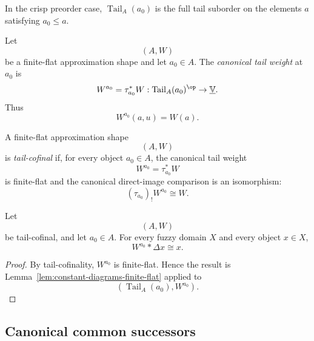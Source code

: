 In the crisp preorder case, \(\operatorname{Tail}_A(a_0)\) is the full tail
suborder on the elements \(a\) satisfying \(a_0\leq a\).

\begin{definition}
\label{def:canonical-tail-weight}
Let
\[
    (A,W)
\]
be a finite-flat approximation shape and let \(a_0\in A\).  The
\emph{canonical tail weight} at \(a_0\) is
\[
    W^{a_0}
    =
    \tau_{a_0}^{*}W
    :
    \operatorname{Tail}_A(a_0)^{\op}
    \to
    \underline{\mathbb V}.
\]
Thus
\[
    W^{a_0}(a,u)=W(a).
\]
\end{definition}

\begin{definition}
\label{def:tail-cofinal-approximation-shape}
A finite-flat approximation shape
\[
    (A,W)
\]
is \emph{tail-cofinal} if, for every object \(a_0\in A\), the canonical tail
weight
\[
    W^{a_0}=\tau_{a_0}^{*}W
\]
is finite-flat and the canonical direct-image comparison is an isomorphism:
\[
    (\tau_{a_0})_!W^{a_0}\cong W.
\]
\end{definition}

\begin{lemma}
\label{lem:constant-diagrams-canonical-tail}
Let
\[
    (A,W)
\]
be tail-cofinal, and let \(a_0\in A\).  For every fuzzy domain \(X\) and every
object \(x\in X\),
\[
    W^{a_0}*\Delta x\cong x.
\]
\end{lemma}

\begin{proof}
By tail-cofinality, \(W^{a_0}\) is finite-flat.  Hence the result is
Lemma~\ref{lem:constant-diagrams-finite-flat} applied to
\[
    (\operatorname{Tail}_A(a_0),W^{a_0}).
\]
\end{proof}

\subsection{Canonical common successors}

